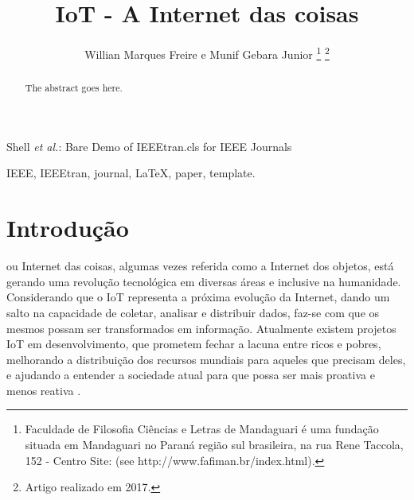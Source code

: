 \documentclass[journal]{IEEEtran}
\begin{document}
\title{IoT - A Internet das coisas}


\author{Willian Marques Freire e
        Munif Gebara Junior%
\thanks{Faculdade de Filosofia Ciências e Letras de Mandaguari é uma fundação
situada em Mandaguari no Paraná região sul brasileira,
na rua Rene Taccola, 152 - Centro Site: (see http://www.fafiman.br/index.html).}%
\thanks{Artigo realizado em 2017.}}



%
{Shell \MakeLowercase{\textit{et al.}}: Bare Demo of IEEEtran.cls for IEEE Journals}

\maketitle

\begin{abstract}
The abstract goes here.
\end{abstract}

\begin{IEEEkeywords}
IEEE, IEEEtran, journal, \LaTeX, paper, template.
\end{IEEEkeywords}




\IEEEpeerreviewmaketitle



\section{Introdução}

 ou Internet das coisas, algumas vezes referida como a Internet dos objetos, está gerando uma revolução tecnológica em diversas áreas e inclusive na humanidade. Considerando que o IoT representa a próxima evolução da Internet, dando um salto na capacidade de coletar, analisar e distribuir dados, faz-se com que os mesmos possam ser transformados em informação. Atualmente existem projetos IoT em desenvolvimento, que prometem fechar a lacuna entre ricos e pobres, melhorando a distribuição dos recursos mundiais para aqueles que precisam deles, e ajudando a entender a sociedade atual para que possa ser mais proativa e menos reativa \cite[p.~2]{Evans}.
\end{document}
